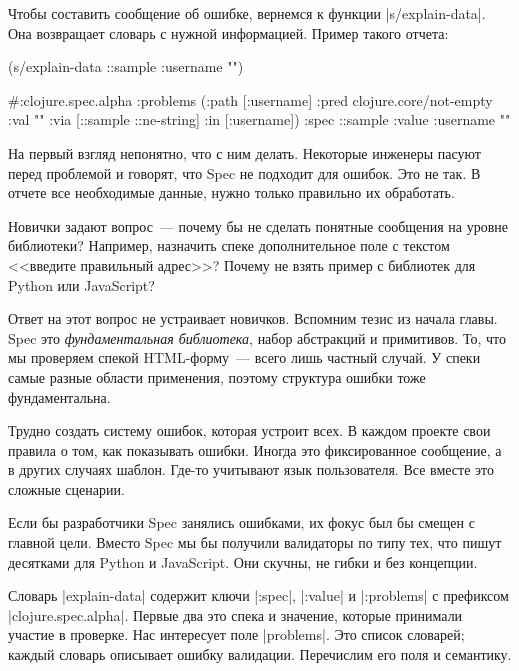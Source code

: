 Чтобы составить сообщение об ошибке, вернемся к функции \spverb|s/explain-data|.
Она возвращает словарь с нужной информацией. Пример такого отчета:

\begin{english}
  \begin{clojure}
(s/explain-data ::sample {:username ""})

#:clojure.spec.alpha
{:problems
 ({:path [:username]
   :pred clojure.core/not-empty
   :val ""
   :via [::sample ::ne-string]
   :in [:username]})
 :spec ::sample
 :value {:username ""}}
  \end{clojure}
\end{english}

На первый взгляд непонятно, что с ним делать. Некоторые инженеры пасуют перед
проблемой и говорят, что Spec не подходит для ошибок. Это не так. В отчете все
необходимые данные, нужно только правильно их обработать.

Новички задают вопрос~--- почему бы не сделать понятные сообщения на уровне
библиотеки? Например, назначить спеке дополнительное поле с текстом <<введите
правильный адрес>>? Почему не взять пример с библиотек для Python или
JavaScript?

Ответ на этот вопрос не устраивает новичков. Вспомним тезис из начала
главы. Spec это \emph{фундаментальная библиотека}, набор абстракций и
примитивов. То, что мы проверяем спекой HTML-форму~--- всего лишь частный
случай. У спеки самые разные области применения, поэтому структура ошибки тоже
фундаментальна.

Трудно создать систему ошибок, которая устроит всех. В каждом проекте свои
правила о том, как показывать ошибки. Иногда это фиксированное сообщение, а в
других случаях шаблон. Где-то учитывают язык пользователя. Все вместе это
сложные сценарии.

Если бы разработчики Spec занялись ошибками, их фокус был бы смещен с главной
цели. Вместо Spec мы бы получили валидаторы по типу тех, что пишут десятками для
Python и JavaScript. Они скучны, не гибки и без концепции.

Словарь \spverb|explain-data| содержит ключи \spverb|:spec|, \spverb|:value| и
\spverb|:problems| с префиксом \spverb|clojure.spec.alpha|. Первые два это спека
и значение, которые принимали участие в проверке. Нас интересует поле
\spverb|problems|. Это список словарей; каждый словарь описывает ошибку
валидации. Перечислим его поля и семантику.

